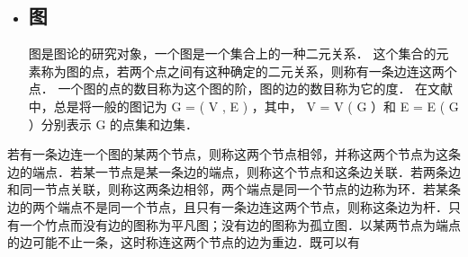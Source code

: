 \begin{itemize}
\item \subsection{图}
图是图论的研究对象，一个图是一个集合上的一种二元关系．
这个集合的元素称为图的点，若两个点之间有这种确定的二元关系，则称有一条边连这两个点．
一个图的点的数目称为这个图的阶，图的边的数目称为它的度．
在文献中，总是将一般的图记为 G = ( V , E ) ，其中， V = V ( G ）和 E = E ( G ）分别表示 G 的点集和边集．
\end{itemize}
若有一条边连一个图的某两个节点，则称这两个节点相邻，并称这两个节点为这条边的端点．若某一节点是某一条边的端点，则称这个节点和这条边关联．若两条边和同一节点关联，则称这两条边相邻，两个端点是同一个节点的边称为环．若某条边的两个端点不是同一个节点，且只有一条边连这两个节点，则称这条边为杆．只有一个竹点而没有边的图称为平凡图；没有边的图称为孤立图．以某两节点为端点的边可能不止一条，这时称连这两个节点的边为重边．既可以有